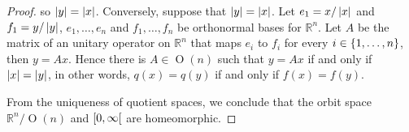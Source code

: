 \begin{proof}
	so $\left\vert{y}\right\vert = \left\vert{x}\right\vert$. Conversely, suppose that $\left\vert{y}\right\vert = \left\vert{x}\right\vert$. Let $e_{1} = x/\left\vert{x}\right\vert$ and $f_{1} = y/\left\vert{y}\right\vert$, $e_{1}, \ldots, e_{n}$ and $f_{1}, \ldots, f_{n}$ be orthonormal bases for $\mathbb{R}^{n}$. Let $A$ be the matrix of an unitary operator on $\mathbb{R}^{n}$ that maps $e_{i}$ to $f_{i}$ for every $i \in \left\{{1, \ldots, n}\right\}$, then $y = Ax$. Hence there is $A \in \operatorname{O}(n)$ such that $y = Ax$ if and only if $\left\vert{x}\right\vert = \left\vert{y}\right\vert$, in other words, $q(x) = q(y)$ if and only if $f(x) = f(y)$.

	From the uniqueness of quotient spaces, we conclude that the orbit space $\mathbb{R}^{n}/\operatorname{O}(n)$ and $\left[{0, \infty}\right[$ are homeomorphic.
\end{proof}
